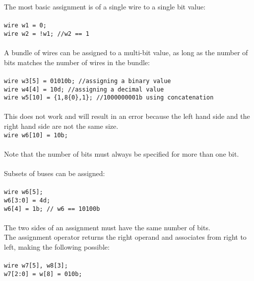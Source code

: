 \documentclass[letterpaper,11pt]{article}
\begin{document}
        The most basic assignment is of a single wire to a single bit value: \\\\
        \texttt{wire w1 = 0;}  \\
        \texttt{wire w2 = !w1;     \slash\slash w2 == 1}\\\\
        A bundle of wires can be assigned to a multi-bit value, as long as the number of bits matches 
        the number of wires in the bundle: \\\\
        \texttt{wire w3[5] = 01010b;	\slash\slash assigning a binary value} \\
        \texttt{wire w4[4] = 10d;       \slash\slash assigning a decimal value} \\
        \texttt{wire w5[10] = \{1,8\{0\},1\};	\slash\slash 1000000001b using concatenation} \\\\
        This does not work and will result in an error because the left hand side and the right hand 
        side are not the same size.\\
        \texttt{wire w6[10] = 10b;} \\\\
        Note that the number of bits must always be specified for more than one bit. \\\\
        Subsets of buses can be assigned: \\\\
        \texttt{wire w6[5];} \\
        \texttt{w6[3:0] = 4d;} \\ 
        \texttt{w6[4] = 1b; // w6 == 10100b} \\\\
        The two sides of an assignment must have the same number of bits. \\
        The assignment operator returns the right operand and associates from 
        right to left, making the following possible:  \\\\
        \texttt{wire w7[5], w8[3];} \\
        \texttt{w7[2:0] = w[8] = 010b;} \\
    
\end{document}
